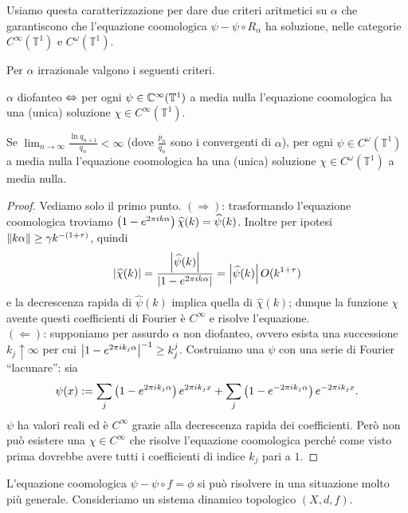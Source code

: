 Usiamo questa caratterizzazione per dare due criteri aritmetici su $\alpha$ che garantiscono
che l'equazione coomologica $\psi-\psi\circ R_\alpha$ ha soluzione,
nelle categorie $C^\infty(\mathbb{T}^1)$ e $C^\omega(\mathbb{T}^1)$.

\begin{teo}Per $\alpha$ irrazionale valgono i seguenti criteri.
\begin{lista}
\item $\alpha$ diofanteo $\Leftrightarrow$ per ogni $\psi\in\mathbb{C}^\infty(\mathbb{T}^1)$ a media nulla
l'equazione coomologica ha una (unica) soluzione $\chi\in C^\infty(\mathbb{T}^1)$.
\item Se $\lim_{n\to\infty}\frac{\ln q_{n+1}}{q_n}<\infty$ (dove $\frac{p_n}{q_n}$ sono i convergenti di $\alpha$),
per ogni $\psi\in C^\omega(\mathbb{T}^1)$ a media nulla
l'equazione coomologica ha una (unica) soluzione $\chi\in C^\omega(\mathbb{T}^1)$ a media nulla.
\end{lista}
\end{teo}

\begin{proof}Vediamo solo il primo punto. $(\Rightarrow)$: trasformando l'equazione coomologica troviamo
$\left(1-e^{2\pi i k\alpha}\right)\widehat{\chi}(k)=\widehat{\psi}(k)$. Inoltre per ipotesi
$\left\|k\alpha\right\|\ge\gamma k^{-(1+\tau)}$, quindi
\[ \left|\widehat{\chi}(k)\right|=\frac{\left|\widehat{\psi}(k)\right|}{\left|1-e^{2\pi i k\alpha}\right|}=\left|\widehat{\psi}(k)\right|O(k^{1+\tau}) \]
e la decrescenza rapida di $\widehat{\psi}(k)$ implica quella di $\widehat{\chi}(k)$;
dunque la funzione $\chi$ avente questi coefficienti di Fourier è $C^\infty$ e risolve l'equazione. \\
$(\Leftarrow)$: supponiamo per assurdo $\alpha$ non diofanteo, ovvero esista una successione $k_j\uparrow\infty$
per cui $\left|1-e^{2\pi i k_j\alpha}\right|^{-1}\ge k_j^j$. Costruiamo una $\psi$ con una serie di Fourier ``lacunare'': sia
\[ \psi(x):=\sum_j \left(1-e^{2\pi i k_j\alpha}\right)e^{2\pi i k_j x}+\sum_j \left(1-e^{-2\pi i k_j\alpha}\right)e^{-2\pi i k_j x}. \]
$\psi$ ha valori reali ed è $C^\infty$ grazie alla decrescenza rapida dei coefficienti.
Però non può esistere una $\chi\in C^\infty$ che risolve l'equazione coomologica perché come visto prima
dovrebbe avere tutti i coefficienti di indice $k_j$ pari a $1$.
\end{proof}

L'equazione coomologica $\psi-\psi\circ f=\phi$ si può risolvere in una situazione molto più generale.
Consideriamo un sistema dinamico topologico $(X,d,f)$.

